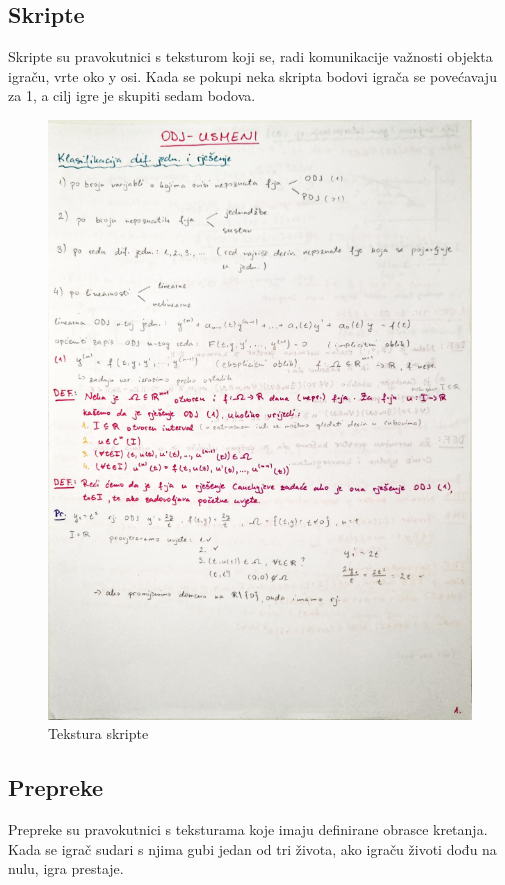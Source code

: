 \documentclass{mathos}
\begin{document}
\subsection{Skripte}
Skripte su pravokutnici s teksturom koji se, radi komunikacije važnosti objekta igraču, vrte oko y osi. Kada se pokupi neka skripta bodovi igrača se povećavaju za 1, a cilj igre
je skupiti sedam bodova.

\begin{figure}[H]
    \centering
    \includegraphics[scale=0.5]{Slike/script.png}
    \caption{Tekstura skripte}
    \label{im_skripta}
\end{figure}

\subsection{Prepreke}
Prepreke su pravokutnici s teksturama koje imaju definirane obrasce kretanja. Kada se igrač sudari s njima gubi jedan od tri života, ako igraču životi dođu na nulu, igra prestaje.
\end{document}
